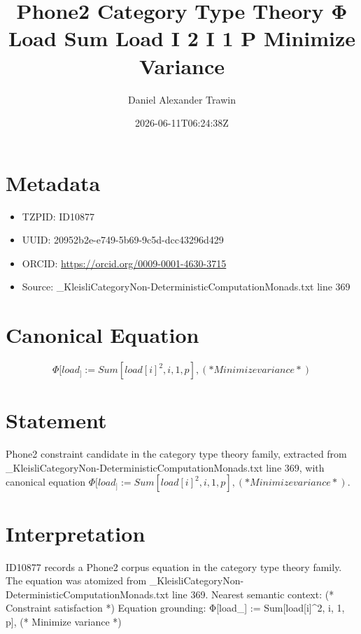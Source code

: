 \documentclass[11pt]{article}
\title{Phone2 Category Type Theory Φ Load Sum Load I 2 I 1 P Minimize Variance}
\author{Daniel Alexander Trawin}
\date{2026-06-11T06:24:38Z}
\begin{document}
\maketitle
\section*{Metadata}
\begin{itemize}
\item TZPID: ID10877
\item UUID: 20952b2e-e749-5b69-9c5d-dcc43296d429
\item ORCID: \url{https://orcid.org/0009-0001-4630-3715}
\item Source: _KleisliCategoryNon-DeterministicComputationMonads.txt line 369
\end{itemize}
\section*{Canonical Equation}
\[
Φ[load_] := Sum[load[i]^2, {i, 1, p}], (* Minimize variance *)
\]
\section*{Statement}
Phone2 constraint candidate in the category type theory family, extracted from _KleisliCategoryNon-DeterministicComputationMonads.txt line 369, with canonical equation $Φ[load_] := Sum[load[i]^2, {i, 1, p}], (* Minimize variance *)$.
\section*{Interpretation}
ID10877 records a Phone2 corpus equation in the category type theory family. The equation was atomized from _KleisliCategoryNon-DeterministicComputationMonads.txt line 369. Nearest semantic context: (* Constraint satisfaction *) Equation grounding: Φ[load_] := Sum[load[i]^2, {i, 1, p}], (* Minimize variance *)
\end{document}
